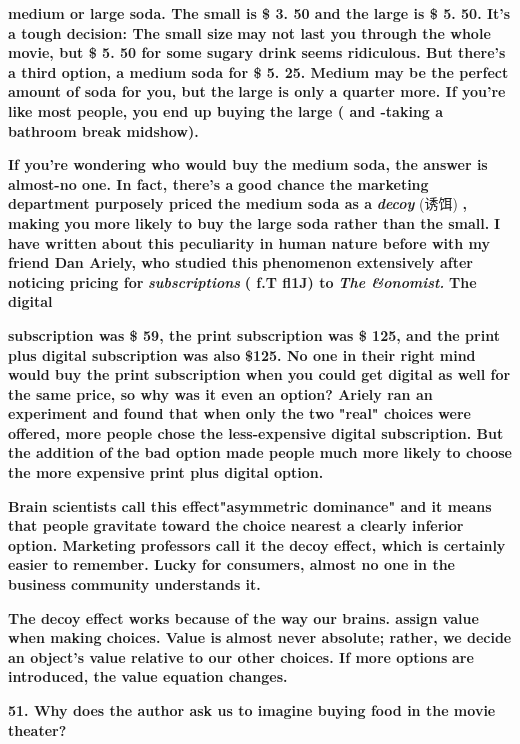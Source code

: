 \documentclass[UTF8,11pt]{ctexart}
\begin{document}
\textbf{medium or large soda. The small is \$ 3. 50 and the large is \$ 5. 50. It's a tough decision: The small size} \textbf{may not last you through the whole movie, but \$ 5. 50 for some sugary drink seems ridiculous. But there's} \textbf{a third option, a medium soda for \$ 5. 25. Medium may be the perfect amount of soda for you, but the} \textbf{large is only a quarter more. If you're like most people, you end up buying the large ( and -taking a} \textbf{bathroom break midshow).}


\textbf{If you're wondering who would buy the medium soda, the answer is almost-no one. In fact, there's a} \textbf{good chance the marketing department purposely priced the medium soda as a }\textbf{\textit{decoy }}(诱饵)\textbf{ , making you} \textbf{more likely to buy the large soda rather than the small.} \textbf{I have written about this peculiarity in human nature before with my friend Dan Ariely, who studied this} \textbf{phenomenon extensively after noticing pricing for }\textbf{\textit{subscriptions }}\textbf{( f.T fl1J) to }\textbf{\textit{The \&onomist. }}\textbf{The digital}


\textbf{subscription was \$ 59, the print subscription was \$ 125, and the print plus\textperiodcentered{} digital subscription was also} \textbf{\$125. No one in their right mind would buy the print subscription when you could get digital as well for} \textbf{the same price, so why was it even an option? Ariely ran an experiment and found that when only the two} \textbf{"real" choices were offered, more people chose the less-expensive digital subscription. But the addition of} \textbf{the bad option made people much more likely to choose the more expensive print plus digital option.}


\textbf{Brain scientists call this effect"asymmetric dominance" and it means that people gravitate toward the} \textbf{choice nearest a clearly inferior option. Marketing professors call it the decoy effect, which is certainly} \textbf{easier to remember. Lucky for consumers, almost no one in the business community understands it.}


\textbf{The decoy effect works because of the way our brains. assign value when making choices. Value is} \textbf{almost never absolute; rather, we decide an object's value relative to our other choices. If more options} \textbf{are introduced, the value equation changes.}


\textbf{51. Why does the author ask us to imagine buying food in the movie theater?}
\end{document}

